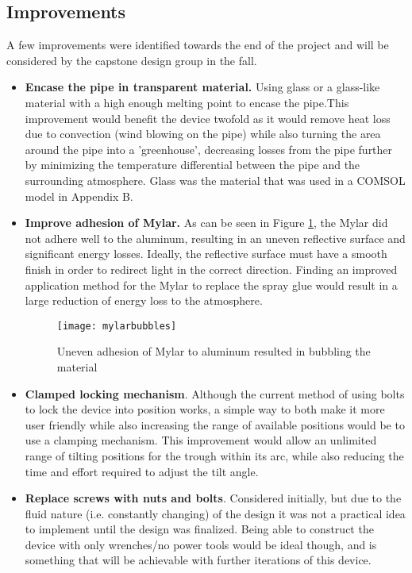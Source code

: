 \documentclass[11pt,english]{article}
\begin{document}
\subsection{Improvements}
A few improvements were identified towards the end of the project and will be considered by the capstone design group in the fall. 

\begin{itemize}
\item \textbf{Encase the pipe in transparent material.} Using glass or a glass-like material with a high enough melting point to encase the pipe.This improvement would benefit the device twofold as it would remove heat loss due to convection (wind blowing on the pipe) while also turning the area around the pipe into a 'greenhouse', decreasing losses from the pipe further by minimizing the temperature differential between the pipe and the surrounding atmosphere. Glass was the material that was used in a COMSOL model in Appendix B. 
\item \textbf{Improve adhesion of Mylar\textsuperscript{\textregistered}.} As can be seen in Figure \ref{fig:mylarbubs}, the Mylar\textsuperscript{\textregistered} did not adhere well to the aluminum, resulting in an uneven reflective surface and significant energy losses. Ideally, the reflective surface must have a smooth finish in order to redirect light in the correct direction. Finding an improved application method for the Mylar\textsuperscript{\textregistered} to replace the spray glue would result in a large reduction of energy loss to the atmosphere.
\begin{figure}[ht!]
\centering
\texttt{[image: mylarbubbles]}
\caption{Uneven adhesion of Mylar\textsuperscript{\textregistered} to aluminum resulted in bubbling the material}
\label{fig:mylarbubs}
\end{figure}
\newpage
\item \textbf{Clamped locking mechanism}. Although the current method of using bolts to lock the device into position works, a simple way to both make it more user friendly while also increasing the range of available positions would be to use a clamping mechanism. This improvement would allow an unlimited range of tilting positions for the trough within its arc, while also reducing the time and effort required to adjust the tilt angle.
\item \textbf{Replace screws with nuts and bolts}. Considered initially, but due to the fluid nature (i.e. constantly changing) of the design it was not a practical idea to implement until the design was finalized. Being able to construct the device with only wrenches/no power tools would be ideal though, and is something that will be achievable with further iterations of this device. 

\end{itemize}
\end{document}
